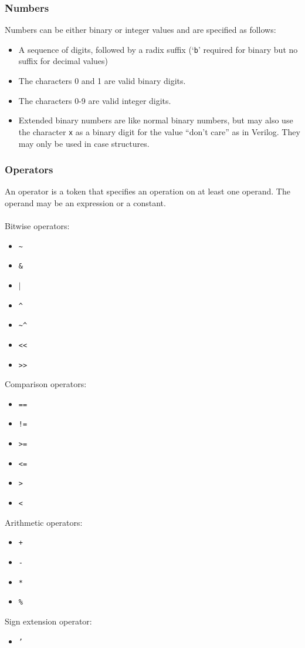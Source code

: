 \documentclass[letterpaper,11pt]{article}
\begin{document}
        \subsubsection{Numbers}
        Numbers can be either binary or integer values and are specified as follows: 
        \begin{itemize}
        \item{A sequence of digits, followed by a radix suffix (`\texttt{b}' required for binary but no suffix for decimal values)}
        \item{The characters 0 and 1 are valid binary digits.} 
        \item{The characters 0-9 are valid integer digits.}
        \item{Extended binary numbers are like normal binary numbers, but may also use the
        character \texttt{x} as a binary digit for the value ``don't care'' as in Verilog. They may only be used in case structures.}
        \end{itemize}
        \subsubsection{Operators}
        An operator is a token that specifies an operation on at least one operand. The operand 
        may be an expression or a constant. \\\\
        Bitwise operators:
        \begin{itemize}
        \item{\texttt{\~}} 
        \item{\texttt{\& }}
        \item{\texttt{$\mid$}}
        \item{\texttt{\^}}
        \item{\texttt{\textasciitilde \^}} 
        \item{\texttt{<<}} 
        \item{\texttt{>>}}
        \end{itemize}
        Comparison operators: 
        \begin{itemize}
        \item{\texttt{==}}
        \item{\texttt{!=}}
        \item{\texttt{>= }}
        \item{\texttt{<= }}
        \item{\texttt{> }}
        \item{\texttt{<}}
        \end{itemize}
        Arithmetic operators: 
        \begin{itemize}
        \item{\texttt{+}}
        \item{\texttt{- }}
        \item{\texttt{* }}
        \item{\texttt{\%}} 
        \end{itemize}
        Sign extension operator: 
        \begin{itemize}
        \item{\texttt{'}}
        \end{itemize}
\end{document}
